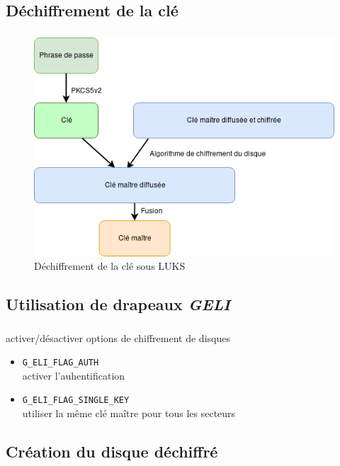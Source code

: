 \subsection{Déchiffrement de la clé}

\begin{frame}
	\frametitle{\insertsubsectionhead}
	\begin{figure}
		\includegraphics[width=.7\textwidth]{developpement/dechiffrement_cle}
		\caption{Déchiffrement de la clé sous LUKS}
	\end{figure}
\end{frame}

\subsection{Utilisation de drapeaux \textit{GELI}}

\begin{frame}
  \frametitle{\insertsubsectionhead}
  \begin{block}{activer/désactiver options de chiffrement de disques}
    \begin{itemize}
    \item \texttt{G\_ELI\_FLAG\_AUTH} \\
      \textrightarrow{} activer l'auhentification
    \item \texttt{G\_ELI\_FLAG\_SINGLE\_KEY} \\
      \textrightarrow{} utiliser la même clé maître pour tous les secteurs
    \end{itemize}
  \end{block}
\end{frame}

\subsection{Création du disque déchiffré}

